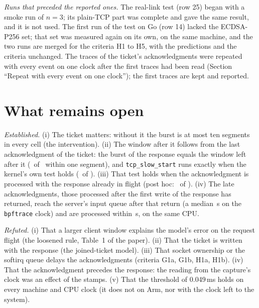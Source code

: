 \documentclass[9pt]{article}
\newcommand{\ms}{\,ms\xspace}
\begin{document}
\emph{Runs that preceded the reported ones.} The real-link test (row 25) began with a smoke run of $n=3$; its plain-TCP part was complete and gave the same result, and it is not used. The first run of the test on Go (row 14) lacked the ECDSA-P256 set; that set was measured again on its own, on the same machine, and the two runs are merged for the criteria H1 to H5, with the predictions and the criteria unchanged. The traces of the ticket's acknowledgments were repeated with every event on one clock after the first traces had been read (Section ``Repeat with every event on one clock''); the first traces are kept and reported.

\section*{What remains open}
\emph{Established.} (i) The ticket matters: without it the burst is at most ten segments in every cell (the intervention). (ii) The window after it follows from the last acknowledgment of the ticket: the burst of the response equals the window left after it (\StPTwoBRight\ of \StPTwoBN\ within one segment), and \texttt{tcp\_slow\_start} runs exactly when the kernel's own test holds (\StPOneRight\ of \StPOneN). (iii) That test holds when the acknowledgment is processed with the response already in flight (post hoc: \StLateInflight\ of \StLate). (iv) The late acknowledgments, those processed after the first write of the response has returned, reach the server's input queue after that return (a median \HEnqMed\,\textmu s on the \texttt{bpftrace} clock) and are processed within \HWaitMed\,\textmu s, on the same CPU.

\emph{Refuted.} (i) That a larger client window explains the model's error on the request flight (the loosened rule, Table~1 of the paper). (ii) That the ticket is written with the response (the joined-ticket model). (iii) That socket ownership or the softirq queue delays the acknowledgments (criteria G1a, G1b, H1a, H1b). (iv) That the acknowledgment precedes the response: the reading from the capture's clock was an effect of the stamps. (v) That the threshold of 0.049\ms holds on every machine and CPU clock (it does not on Arm, nor with the clock left to the system).
\end{document}
